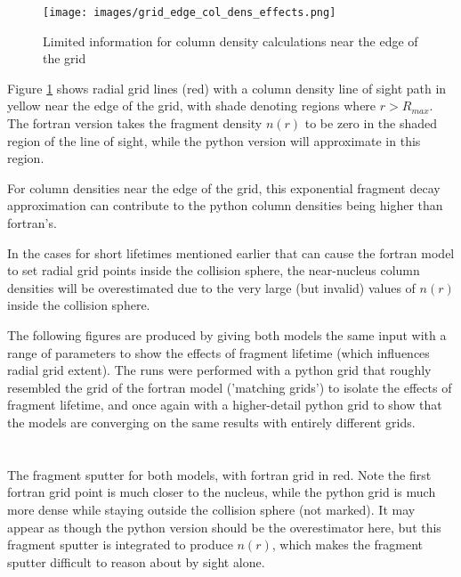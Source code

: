 \documentclass[11pt]{article}
\newcommand{\newproblem}[1]{\section*{\contour{mybblack}{\textcolor{myblack}{#1}}}}
\newcommand{\problempart}[1]{\subsection*{\contour{mybblack}{\textcolor{myblack}{#1}}}}
\begin{document}
\begin{multicols}{2}
\begin{figure}[H]
  \texttt{[image: images/grid\_edge\_col\_dens\_effects.png]}
  \caption{Limited information for column density calculations near the edge of the grid}
  \label{fig:grid_edge}
\end{figure}
Figure \ref{fig:grid_edge} shows radial grid lines (red) with a column density line of sight path in yellow near the edge of the grid, with shade denoting regions where \(r > R_{max}\).
The fortran version takes the fragment density \(n(r)\) to be zero in the shaded region of the line of sight, while the python version will approximate in this region.

For column densities near the edge of the grid, this exponential fragment decay approximation can contribute to the python column densities being higher than fortran's.
\end{multicols}

In the cases for short lifetimes mentioned earlier that can cause the fortran model to set radial grid points inside the collision sphere, the near-nucleus column densities will be overestimated due to the very large (but invalid) values of \(n(r)\) inside the collision sphere.

\newpage

The following figures are produced by giving both models the same input with a range of parameters to show the effects of fragment lifetime (which influences radial grid extent).
The runs were performed with a python grid that roughly resembled the grid of the fortran model ('matching grids') to isolate the effects of fragment lifetime, and once again with a higher-detail python grid to show that the models are converging on the same results with entirely different grids.
\newproblem{Effect of Matching Grid Parameters, Fragment Lifetime 20000 s}
\problempart{Fragment Sputter}

The fragment sputter for both models, with fortran grid in red.
Note the first fortran grid point is much closer to the nucleus, while the python grid is much more dense while staying outside the collision sphere (not marked).
It may appear as though the python version should be the overestimator here, but this fragment sputter is integrated to produce \(n(r)\), which makes the fragment sputter difficult to reason about by sight alone.
\end{document}
